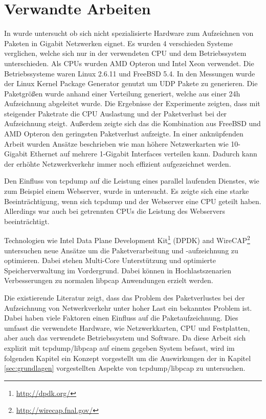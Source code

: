 \section{Verwandte Arbeiten}
\label{sec:verwandte-arbeiten}

In \cite{schneider05da,DBLP:conf/conext/SchneiderW05} wurde untersucht ob sich
nicht spezialisierte Hardware zum Aufzeichnen von Paketen in Gigabit Netzwerken
eignet. Es wurden 4 verschieden Systeme verglichen, welche sich nur in der
verwendeten CPU und dem Betriebssystem unterschieden. Als CPUs wurden AMD
Opteron und Intel Xeon verwendet. Die Betriebssysteme waren Linux 2.6.11 und
FreeBSD 5.4. In den Messungen wurde der Linux Kernel Package Generator
\cite{DBLP:journals/comcom/TurullSO16} genutzt um UDP Pakete zu generieren. Die
Paketgrößen wurde anhand einer Verteilung generiert, welche aus einer 24h
Aufzeichnung abgeleitet wurde. Die Ergebnisse der Experimente zeigten, dass mit
steigender Paketrate die CPU Auslastung und der Paketverlust bei der
Aufzeichnung steigt. Außerdem zeigte sich das die Kombination aus FreeBSD und
AMD Opteron den geringsten Paketverlust aufzeigte. In einer anknüpfenden Arbeit
\cite{DBLP:conf/pam/SchneiderWF07} wurden Ansätze beschrieben wie man höhere
Netzwerkarten wie 10-Gigabit Ethernet auf mehrere 1-Gigabit Interfaces
verteilen kann. Dadurch kann der erhöhte Netzwerkverkehr immer noch effizient
aufgezeichnet werden.

Den Einfluss von tcpdump auf die Leistung eines parallel laufenden Dienstes,
wie zum Beispiel einem Webserver, wurde in \cite{DBLP:conf/globecom/ChenCCM11}
untersucht. Es zeigte sich eine starke Beeinträchtigung, wenn sich
tcpdump und der Webserver eine CPU geteilt haben. Allerdings war auch bei
getrennten CPUs die Leistung des Webservers beeinträchtigt.

Technologien wie Intel Data Plane Development
Kit\footnote{\url{http://dpdk.org/}} (DPDK) and
WireCAP\footnote{\url{http://wirecap.fnal.gov/}} \cite{DBLP:conf/imc/WuD14}
untersuchen neue Ansätze um die Paketverarbeitung und -aufzeichnung zu
optimieren.  Dabei stehen Multi-Core Unterstützung und optimierte
Speicherverwaltung im Vordergrund.  Dabei können in Hochlastszenarien
Verbesserungen zu normalen libpcap Anwendungen erzielt werden.

Die existierende Literatur zeigt, dass das Problem des Paketverlustes bei
der Aufzeichnung von Netwerkverkehr unter hoher Last ein bekanntes Problem
ist. Dabei haben viele Faktoren einen Einfluss auf die Paketaufzeichnung. Dies
umfasst die verwendete Hardware, wie Netzwerkkarten, CPU und Festplatten, aber
auch das verwendete Betriebssystem und Software. Da diese Arbeit sich explizit
mit tcpdump/libpcap auf einem gegeben System befasst, wird im folgenden Kapitel
ein Konzept vorgestellt um die Auswirkungen der in Kapitel \ref{sec:grundlagen}
vorgestellten Aspekte von tcpdump/libpcap zu untersuchen.

